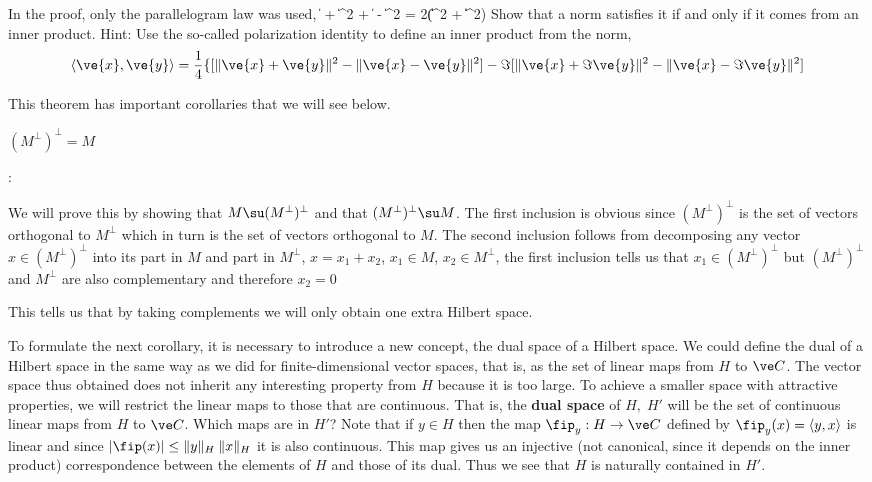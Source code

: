 \bpro 
In the proof, only the parallelogram law was used,
\beq
\label{paralelogramo}
\| + \|^2 + \| - \|^2  = 
                     2(\|\|^2 + \|\|^2) 
\eeq
%
Show that a norm satisfies it if and only if it comes from an
inner product. 
Hint: Use the so-called polarization identity to define an 
inner product from the norm,
\begin{equation}
  \label{eq:polarizacion}
  \langle\ve{x}, \ve{y}\rangle = \frac{1}{4}\{
               [\|\ve{x} + \ve{y}\|^2 - \|\ve{x} - \ve{y}\|^2]
              -\Im [\|\ve{x} + \Im \ve{y}\|^2 - \|\ve{x} - \Im \ve{y}\|^2]
\end{equation}
\epro

This theorem has important corollaries that we will see below.

\bcor 
$(M^{\perp})^{\perp}=M$
\ecor

\pru:

We will prove this by showing that $M\su (M^{\perp})^{\perp}$ and that 
$(M^{\perp})^{\perp}\su M$.
The first inclusion is obvious since $(M^{\perp})^{\perp}$ 
is the set of vectors orthogonal
to $M^{\perp}$ which in turn is the set of vectors orthogonal to $M$.
The second inclusion follows from decomposing any vector
$x\in (M^{\perp})^{\perp}$ into its part in $M$ and part in $M^{\perp}$, $
x=x_1+x_2$, $x_1\in M$, $x_2\in M^{\perp}$,  
the first inclusion tells us that $x_1\in(M^{\perp})^{\perp}$ but
$(M^{\perp})^{\perp}$ and $M^{\perp}$ are also
complementary and therefore $x_2=0$ 
\epru

This tells us that by taking complements we will only obtain
one extra Hilbert space.

To formulate the next corollary, it is necessary to introduce a new
concept, the dual space of a Hilbert space. We could
define the dual of a Hilbert space in the same way as we
did for finite-dimensional vector spaces, that is, as
the set of linear maps from $H$ to $\ve C$. The vector space thus
obtained does not inherit any interesting property from $H$ because it is too large.
To achieve a smaller space with attractive properties,
we will restrict the linear maps to those that are continuous. 
That is,
the {\bf dual space} of $H,\;H'$ will be the set of continuous linear maps 
from $H$ to $\ve C$. 
Which maps are in $H'$? 
Note that if $y\in H$ then the map $\fip_y:H\to \ve C$ 
defined by $\fip_y(x)=\langle y,x\rangle$ is linear and since $|\fip(x)|\leq\|y\|_H\:\|x\|_H$
it is also continuous. This map gives us an injective 
(not canonical, since it depends on the inner product) correspondence between the
elements of $H$ and those of its dual.
Thus we see that $H$ is naturally contained in $H'$.

